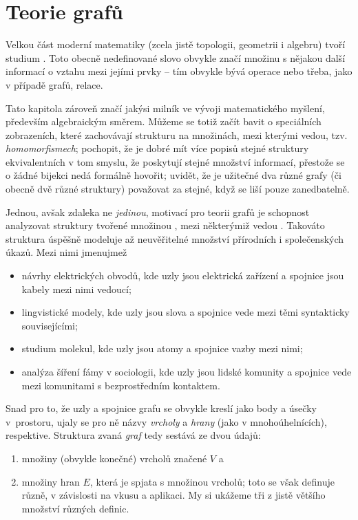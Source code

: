 \section{Teorie grafů}
\label{sec:teorie-grafu}

Velkou část moderní matematiky (zcela jistě topologii, geometrii i algebru)
tvoří studium . Toto obecně nedefinované slovo obvykle značí
množinu s nějakou další informací o vztahu mezi jejími prvky -- tím obvykle bývá
operace nebo třeba, jako v případě grafů, relace.

Tato kapitola zároveň značí jakýsi milník ve vývoji matematického myšlení,
především algebraickým směrem. Můžeme se totiž začít bavit o speciálních
zobrazeních, které zachovávají strukturu na množinách, mezi kterými vedou, tzv.
\emph{homomorfismech}; pochopit, že je dobré mít více popisů stejné struktury
ekvivalentních v tom smyslu, že poskytují stejné množství informací, přestože se
o žádné bijekci nedá formálně hovořit; uvidět, že je užitečné dva různé grafy
(či obecně dvě různé struktury) považovat za stejné, když se liší pouze
zanedbatelně.

Jednou, avšak zdaleka ne \emph{jedinou}, motivací pro teorii grafů je schopnost
analyzovat struktury tvořené množinou , mezi některýmiž vedou
. Takováto struktura úspěšně modeluje až neuvěřitelné množství
přírodních i společenských úkazů. Mezi nimi jmenujmež
\begin{itemize}
 \item návrhy elektrických obvodů, kde uzly jsou elektrická zařízení a spojnice
  jsou kabely mezi nimi vedoucí;
 \item lingvistické modely, kde uzly jsou slova a spojnice vede mezi
  těmi syntakticky souvisejícími;
 \item studium molekul, kde uzly jsou atomy a spojnice vazby mezi nimi;
 \item analýza šíření fámy v sociologii, kde uzly jsou lidské komunity a
  spojnice vede mezi komunitami s bezprostředním kontaktem.
\end{itemize}

Snad pro to, že uzly a spojnice grafu se obvykle kreslí jako body a úsečky
v~prostoru, ujaly se pro ně názvy \emph{vrcholy} a \emph{hrany} (jako v
mnohoúhelnících), respektive. Struktura zvaná \emph{graf} tedy sestává ze dvou
údajů:
\begin{enumerate}
 \item množiny (obvykle konečné) vrcholů značené $V$ a
 \item množiny hran $E$, která je spjata s množinou vrcholů; toto  se
  však definuje různě, v závislosti na vkusu a aplikaci. My si ukážeme tři z
  jistě většího množství různých definic.
\end{enumerate}

